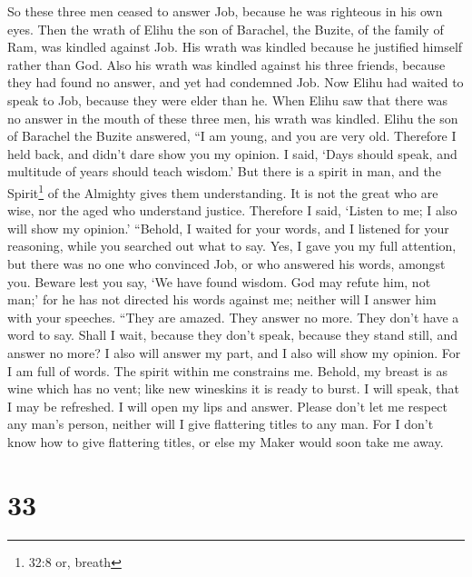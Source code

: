  So these three men ceased to answer Job, because he was
righteous in his own eyes.  Then the wrath of Elihu the son
of Barachel, the Buzite, of the family of Ram, was kindled against Job.
His wrath was kindled because he justified himself rather than God.
 Also his wrath was kindled against his three friends,
because they had found no answer, and yet had condemned Job.
 Now Elihu had waited to speak to Job, because they were
elder than he.  When Elihu saw that there was no answer in
the mouth of these three men, his wrath was kindled.  Elihu
the son of Barachel the Buzite answered, ``I am young, and you are very
old. Therefore I held back, and didn't dare show you my opinion.
 I said, `Days should speak, and multitude of years should
teach wisdom.'  But there is a spirit in man, and the
Spirit\footnote{32:8 or, breath} of the Almighty gives them
understanding.  It is not the great who are wise, nor the
aged who understand justice.  Therefore I said, `Listen to
me; I also will show my opinion.'  ``Behold, I waited for
your words, and I listened for your reasoning, while you searched out
what to say.  Yes, I gave you my full attention, but there
was no one who convinced Job, or who answered his words, amongst you.
 Beware lest you say, `We have found wisdom. God may refute
him, not man;'  for he has not directed his words against
me; neither will I answer him with your speeches.  ``They
are amazed. They answer no more. They don't have a word to say.
 Shall I wait, because they don't speak, because they stand
still, and answer no more?  I also will answer my part, and
I also will show my opinion.  For I am full of words. The
spirit within me constrains me.  Behold, my breast is as
wine which has no vent; like new wineskins it is ready to burst.
 I will speak, that I may be refreshed. I will open my lips
and answer.  Please don't let me respect any man's person,
neither will I give flattering titles to any man.  For I
don't know how to give flattering titles, or else my Maker would soon
take me away.

\hypertarget{section-23}{%
\section{33}\label{section-23}}

